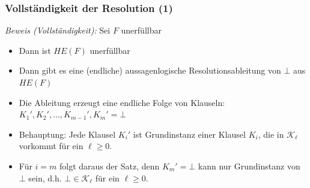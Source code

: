 \documentclass[aspectratio=1610,onlymath]{beamer}
\begin{document}
\begin{frame}[t]\frametitle{Vollständigkeit der Resolution (1)}

\pause

\emph{Beweis (Vollständigkeit):} Sei $F$ unerfüllbar
\begin{itemize}
\item Dann ist $HE(F)$ unerfüllbar
\item Dann gibt es eine (endliche) aussagenlogische Resolutionsableitung von $\bot$ aus $HE(F)$
\item Die Ableitung erzeugt eine endliche Folge von Klauseln: $K_1',K_2',\ldots,K_{m-1}',K_m'=\bot$
\item \alert{Behauptung:} Jede Klausel $K_i'$ ist Grundinstanz einer Klausel $K_i$, die in $\mathcal{K}_\ell$ vorkommt für ein $\ell\geq 0$.
\item Für $i=m$ folgt daraus der Satz, denn $K_m'=\bot$ kann nur Grundinstanz von $\bot$ sein, d.h. $\bot\in\mathcal{K}_\ell$ für ein $\ell\geq 0$.
\end{itemize}

\end{frame}
\end{document}
